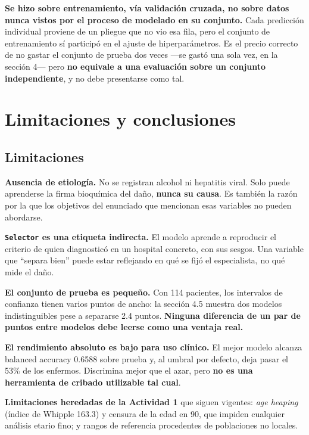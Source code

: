\documentclass[10pt,a4paper]{article}
\begin{document}
\textbf{Se hizo sobre entrenamiento, vía validación cruzada, no sobre datos nunca vistos por el proceso de modelado en su conjunto.} Cada predicción individual proviene de un pliegue que no vio esa fila, pero el conjunto de entrenamiento sí participó en el ajuste de hiperparámetros. Es el precio correcto de no gastar el conjunto de prueba dos veces ---se gastó una sola vez, en la sección 4--- pero \textbf{no equivale a una evaluación sobre un conjunto independiente}, y no debe presentarse como tal.

\section{Limitaciones y conclusiones}

\subsection{Limitaciones}

\textbf{Ausencia de etiología.} No se registran alcohol ni hepatitis viral. Solo puede aprenderse la firma bioquímica del daño, \textbf{nunca su causa}. Es también la razón por la que los objetivos del enunciado que mencionan esas variables no pueden abordarse.

\textbf{\texttt{Selector} es una etiqueta indirecta.} El modelo aprende a reproducir el criterio de quien diagnosticó en un hospital concreto, con sus sesgos. Una variable que ``separa bien'' puede estar reflejando en qué se fijó el especialista, no qué mide el daño.

\textbf{El conjunto de prueba es pequeño.} Con 114 pacientes, los intervalos de confianza tienen varios puntos de ancho: la sección 4.5 muestra dos modelos indistinguibles pese a separarse 2.4 puntos. \textbf{Ninguna diferencia de un par de puntos entre modelos debe leerse como una ventaja real.}

\textbf{El rendimiento absoluto es bajo para uso clínico.} El mejor modelo alcanza balanced accuracy 0.6588 sobre prueba y, al umbral por defecto, deja pasar el 53\% de los enfermos. Discrimina mejor que el azar, pero \textbf{no es una herramienta de cribado utilizable tal cual}.

\textbf{Limitaciones heredadas de la Actividad 1} que siguen vigentes: \textit{age heaping} (índice de Whipple 163.3) y censura de la edad en 90, que impiden cualquier análisis etario fino; y rangos de referencia procedentes de poblaciones no locales.
\end{document}
